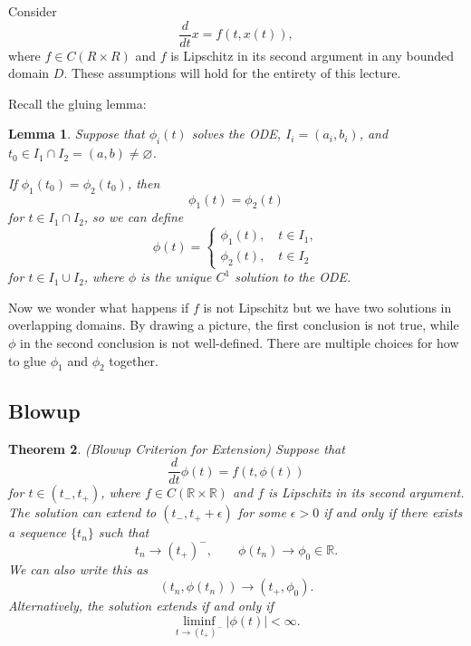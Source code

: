 \documentclass{tufte-handout}
\newcommand*\R{\mathbb{R}}
\let\O\varnothing
\newtheorem{thm}{Theorem}[subsection]
\newtheorem{lemma}[thm]{Lemma}
\theoremstyle{definition}
\begin{document}
Consider \[
	\frac{d}{dt}x = f(t,x(t))
,\] where $f \in C(R \times R)$ and $f$ is Lipschitz in its second argument in any bounded domain $D$. These assumptions will hold for the entirety of this lecture.

Recall the gluing lemma:
\begin{lemma}
	Suppose that $\phi_i(t)$ solves the ODE, $I_i = (a_i,b_i)$, and $t_0 \in I_1 \cap I_2 = (a,b) \ne \O$.

	If $\phi_1(t_0) = \phi_2(t_0)$, then \[
		\phi_1(t) = \phi_2(t)
	\] for $t \in I_1 \cap I_2$, so we can define \[
		\phi(t) = \begin{cases}
			\phi_1(t), \quad t \in I_1, \\
			\phi_2(t), \quad t \in I_2
		\end{cases}
	\] for $t \in I_1 \cup I_2$, where $\phi$ is the unique $C^1$ solution to the ODE.
\end{lemma}

Now we wonder what happens if $f$ is not Lipschitz but we have two solutions in overlapping domains. By drawing a picture, the first conclusion is not true, while $\phi$ in the second conclusion is not well-defined. There are multiple choices for how to glue $\phi_1$ and $\phi_2$ together.

\subsection{Blowup}

\begin{thm} \label{thm:blowup}
	(Blowup Criterion for Extension) Suppose that \[
		\frac{d}{dt}\phi(t) = f(t,\phi(t))
	\] for $t \in (t_-, t_+)$, where $f \in C(\R\times \R)$ and $f$ is Lipschitz in its second argument. The solution can extend to $\left( t_-, t_+ + \epsilon \right)$ for some $\epsilon > 0$ if and only if there exists a sequence $\{t_n\}$ such that \[
		t_n \to \left( t_+ \right)^-, \qquad \phi(t_n) \to \phi_0 \in \R
	.\]We can also write this as \[
	(t_n, \phi(t_n)) \to (t_+, \phi_0)
	.\] Alternatively, the solution extends if and only if \[
		\liminf\limits_{t \to \left( t_+ \right)^{-}} \left| \phi(t) \right| < \infty
	.\] 
\end{thm}
\end{document}
